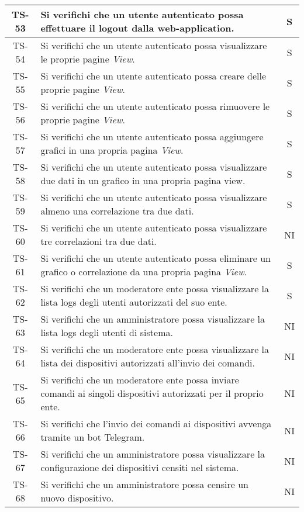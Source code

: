 \begin{center}
\begin{longtable}{|c|p{10cm}|c|}
			 \hline
			 TS-53 & Si verifichi che un utente autenticato possa effettuare il logout dalla web-application. & S \\
			 \hline
			 TS-54 & Si verifichi che un utente autenticato possa visualizzare le proprie pagine \textit{View}. & S \\
			 \hline
			 TS-55 & Si verifichi che un utente autenticato possa creare delle proprie pagine \textit{View}. & S \\
			 \hline
			 TS-56 & Si verifichi che un utente autenticato possa rimuovere le proprie pagine \textit{View}. & S \\
			 \hline
			 TS-57 & Si verifichi che un utente autenticato possa aggiungere grafici in una propria pagina  \textit{View}. & S \\
			 \hline
			 TS-58 & Si verifichi che un utente autenticato possa visualizzare due dati in un grafico in una propria pagina view. & S \\
			 \hline
			 TS-59 & Si verifichi che un utente autenticato possa visualizzare almeno una correlazione tra due dati. & S \\
			 \hline
			 TS-60 & Si verifichi che un utente autenticato possa visualizzare tre correlazioni tra due dati. & NI \\
			 \hline
			 TS-61 & Si verifichi che un utente autenticato possa eliminare un grafico o correlazione da una propria pagina \textit{View}. & S \\
			 \hline
			 TS-62 & Si verifichi che un moderatore ente possa visualizzare la lista logs degli utenti autorizzati del suo ente. & S \\
			 \hline
			 TS-63 & Si verifichi che un amministratore possa visualizzare la lista logs degli utenti di sistema. & NI \\
			 \hline
			 TS-64 & Si verifichi che un moderatore ente possa visualizzare la lista dei dispositivi autorizzati all'invio dei comandi. & NI \\
			 \hline
			 TS-65 & Si verifichi che un moderatore ente possa inviare comandi ai singoli dispositivi autorizzati per il proprio ente. & NI \\
			 \hline
			 TS-66 & Si verifichi che l'invio dei comandi ai dispositivi avvenga tramite un bot Telegram. & NI \\
			 \hline
			 TS-67 & Si verifichi che un amministratore possa visualizzare la configurazione dei dispositivi censiti nel sistema. & NI \\
			 \hline
			 TS-68 & Si verifichi che un amministratore possa censire un nuovo dispositivo. & NI \\

\end{longtable}
\end{center}
